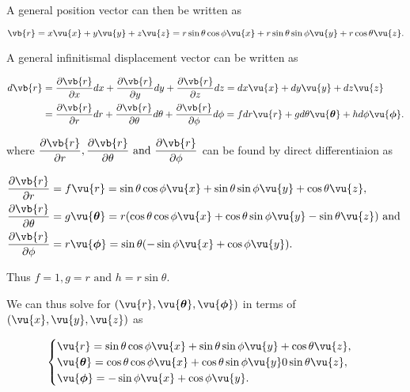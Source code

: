 \documentclass[english,a4paper,12pt]{report}
\begin{document}
A general position vector can then be written as 

\begin{equation}
    \vb{r} = x \vu{x} + y \vu{y} + z \vu{z} = r\sin \theta \cos \phi \vu{x} + r\sin \theta \sin \phi \vu{y} + r \cos \theta \vu{z} .
\end{equation}

A general infinitismal displacement vector can be written as 

\begin{equation}
    \begin{aligned}
    d \vb{r} &= \frac{\partial \vb{r} }{\partial x} dx + \frac{\partial \vb{r} }{\partial y} dy + \frac{\partial \vb{r} }{\partial z} dz = dx \vu{x} + dy \vu{y} + dz \vu{z} \\ &= \frac{\partial \vb{r} }{\partial r} dr + \frac{\partial \vb{r} }{\partial \theta }d\theta + \frac{\partial \vb{r} }{\partial \phi }d \phi =f dr \vu{r} +g d\theta \vu{\boldsymbol{\theta } } +h  d \phi \vu{\boldsymbol{\phi } }. 
    \end{aligned}
\end{equation}

where \(\displaystyle \frac{\partial \vb{r} }{\partial r}, \frac{\partial \vb{r} }{\partial \theta } \text { and } \frac{\partial \vb{r} }{\partial \phi } \) can be found by direct differentiaion as 

\begin{equation}
	\begin{aligned} 
		\frac{\partial \vb{r} }{\partial r}   &= f \vu{r} = \sin{\theta}\cos{\phi}\vu{x} + \sin{\theta}\sin{\phi}\vu{y} + \cos{\theta}\vu{z}, \\
		\frac{\partial \vb{r} }{\partial \theta }  &= g \vu{\boldsymbol{\theta }} = r(\cos{\theta}\cos{\phi}\vu{x} + \cos{\theta}\sin{\phi}\vu{y} - \sin{\theta}\vu{z})\text { and }  \\
		\frac{\partial \vb{r} }{\partial \phi }  &= r \vu{\boldsymbol{\phi } } = \sin \theta (-\sin{\phi}\vu{x} + \cos{\phi}\vu{y}). 
	\end{aligned} 
\end{equation}

Thus \(f = 1, g = r \text { and }  h = r\sin \theta \).

We can thus solve for \((\vu{r} , \vu{\boldsymbol{\theta } }, \vu{\boldsymbol{\phi } })\) in terms of \((\vu{x}, \vu{y} ,\vu{z} )\) as 

\begin{equation}
    \begin{cases}
        \vu{r} = \sin \theta \cos \phi  \vu{x}  + \sin \theta \sin \phi  \vu{y}  + \cos \theta  \vu{z},  \\
        \vu{\boldsymbol{\theta } } = \cos \theta \cos \phi \vu{x}  + \cos \theta \sin \phi \vu{y} 0 \sin \theta \vu{z}, \\
        \vu{\boldsymbol{\phi } } = -\sin \phi  \vu{x} + \cos \phi \vu{y}. 
    \end{cases}
\end{equation}
\end{document}

